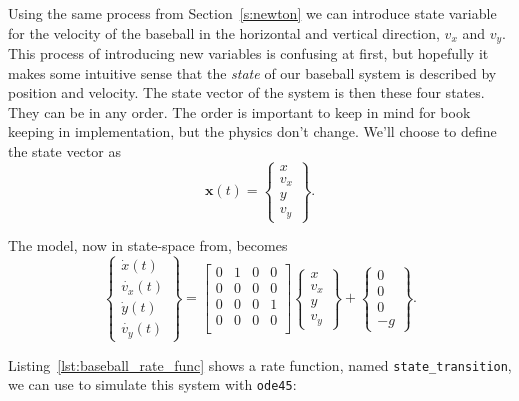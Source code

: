 \documentclass[../../book.tex]{subfiles}
\begin{document}
Using the same process from Section~\ref{s:newton} we can introduce state variable for the velocity of the baseball in the horizontal and vertical direction, $v_x$ and $v_y$.   This process of introducing new variables is confusing at first, but hopefully it makes some intuitive sense that the \emph{state} of our baseball system is described by position and velocity.  The state vector of the system is then these four states.  They can be in any order.  The order is important to keep in mind for book keeping in implementation, but the physics don't change.  We'll choose to define the state vector as
\begin{equation}\label{e:bstate}
    \mathbf{x}(t) = \left\{ \begin{array}{c}
        x \\ v_x  \\ y \\ v_y
    \end{array}\right\}.
\end{equation}

The model, now in state-space from, becomes
\begin{equation}\label{e:baseballstate}
    \left\{ \begin{array}{c}
        \dot{x}(t) \\ \dot{v_x}(t)  \\ \dot{y}(t) \\ \dot{v_y}(t)
    \end{array}\right\}
    =
    \left[ \begin{array}{cccc}
        0  & 1 & 0 & 0\\
        0 & 0 & 0 & 0\\
        0 & 0 & 0 & 1\\
        0 & 0 & 0 & 0\\
    \end{array}
    \right]
    \left\{ \begin{array}{c}
        x \\ v_x  \\ y \\ v_y
    \end{array}\right\}
    +
    \left\{\begin{array}{c}
         0 \\ 0 \\ 0 \\ -g
    \end{array}
    \right\}
    .
\end{equation}

Listing~\ref{lst:baseball_rate_func} shows a rate function, named \lstinline{state_transition}, we can use to simulate this system with \lstinline{ode45}:
\end{document}
